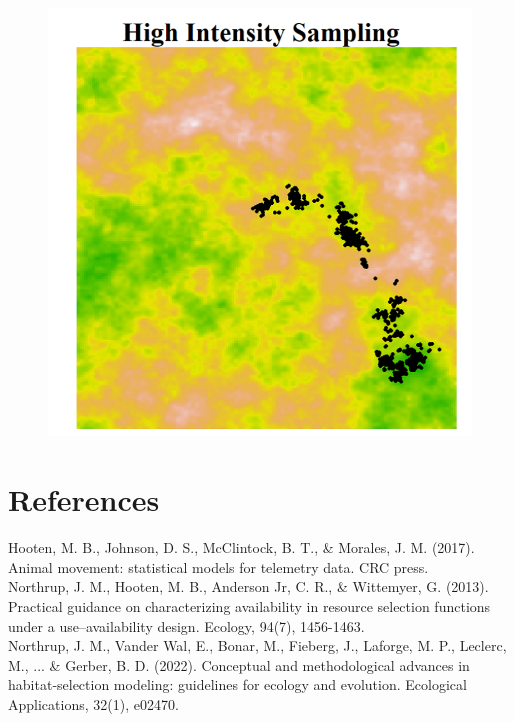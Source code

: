 \documentclass[12pt]{article}
\begin{document}
\begin{figure}[h!]
\centering
\includegraphics{sampling2.png}
\end{figure}

\pagebreak

\section{References}

\indent\indent  Hooten, M. B., Johnson, D. S., McClintock, B. T., \& Morales, J. M. (2017). Animal movement: statistical models for telemetry data. CRC press.\\

Northrup, J. M., Hooten, M. B., Anderson Jr, C. R., \& Wittemyer, G. (2013). Practical guidance on characterizing availability in resource selection functions under a use–availability design. Ecology, 94(7), 1456-1463.\\

Northrup, J. M., Vander Wal, E., Bonar, M., Fieberg, J., Laforge, M. P., Leclerc, M., ... \& Gerber, B. D. (2022). Conceptual and methodological advances in habitat‐selection modeling: guidelines for ecology and evolution. Ecological Applications, 32(1), e02470.
\end{document}
